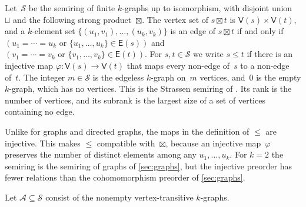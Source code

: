 \documentclass[11pt,letterpaper]{article}
\begin{document}
Let~$\mathcal{S}$ be the semiring of finite $k$-graphs up to isomorphism, with disjoint union~$\sqcup$ and the following strong product~$\boxtimes$. The vertex set of $s \boxtimes t$ is $\mathsf{V}(s) \times \mathsf{V}(t)$, and a $k$-element set $\{(u_1,v_1), \ldots, (u_k,v_k)\}$ is an edge of $s \boxtimes t$ if and only if $(u_1 = \cdots = u_k \text{ or } \{u_1, \ldots, u_k\} \in \mathsf{E}(s))$ and $(v_1 = \cdots = v_k \text{ or } \{v_1, \ldots, v_k\} \in \mathsf{E}(t))$. For $s, t \in \mathcal{S}$ we write $s \leq t$ if there is an injective map $\varphi : \mathsf{V}(s) \to \mathsf{V}(t)$ that maps every non-edge of~$s$ to a non-edge of~$t$. The integer $m \in \mathcal{S}$ is the edgeless $k$-graph on~$m$ vertices, and~$0$ is the empty $k$-graph, which has no vertices. This is the Strassen semiring of \cite[Example~2.22]{wigderson2022asymptotic}. Its rank is the number of vertices, and its subrank is the largest size of a set of vertices containing no edge.

Unlike for graphs and directed graphs, the maps in the definition of $\leq$ are injective. This makes $\leq$ compatible with~$\boxtimes$, because an injective map~$\varphi$ preserves the number of distinct elements among any $u_1, \ldots, u_k$. For $k = 2$ the semiring is the semiring of graphs of \cref{sec:graphs}, but the injective preorder has fewer relations than the cohomomorphism preorder of \cref{sec:graphs}.

Let $\mathcal{A} \subseteq \mathcal{S}$ consist of the nonempty vertex-transitive $k$-graphs.
\end{document}
